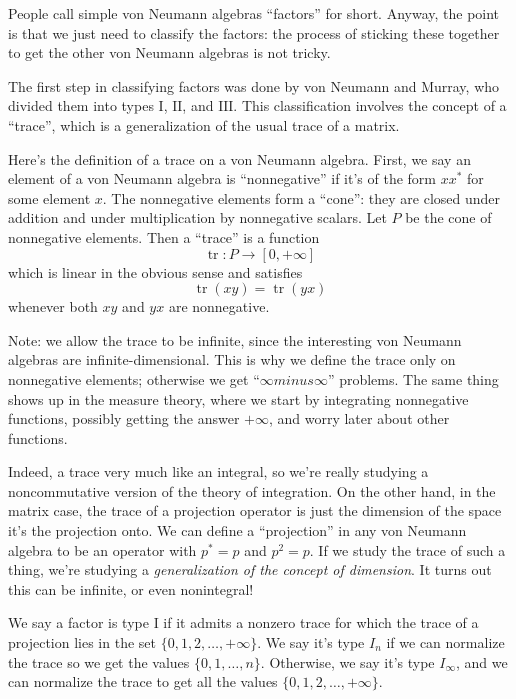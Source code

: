 \documentclass{article}
\begin{document}
People call simple von Neumann algebras ``factors'' for short. Anyway,
the point is that we just need to classify the factors: the process of
sticking these together to get the other von Neumann algebras is not
tricky.

The first step in classifying factors was done by von Neumann and
Murray, who divided them into types \(\mathrm{I}\), \(\mathrm{II}\), and
\(\mathrm{III}\). This classification involves the concept of a
``trace'', which is a generalization of the usual trace of a matrix.

Here's the definition of a trace on a von Neumann algebra. First, we say
an element of a von Neumann algebra is ``nonnegative'' if it's of the
form \(xx^*\) for some element \(x\). The nonnegative elements form a
``cone'': they are closed under addition and under multiplication by
nonnegative scalars. Let \(P\) be the cone of nonnegative elements. Then
a ``trace'' is a function \[\operatorname{tr}\colon P \to [0, +\infty]\]
which is linear in the obvious sense and satisfies
\[\operatorname{tr}(xy) = \operatorname{tr}(yx)\] whenever both \(xy\)
and \(yx\) are nonnegative.

Note: we allow the trace to be infinite, since the interesting von
Neumann algebras are infinite-dimensional. This is why we define the
trace only on nonnegative elements; otherwise we get
``\(\infty minus \infty\)'' problems. The same thing shows up in the
measure theory, where we start by integrating nonnegative functions,
possibly getting the answer \(+\infty\), and worry later about other
functions.

Indeed, a trace very much like an integral, so we're really studying a
noncommutative version of the theory of integration. On the other hand,
in the matrix case, the trace of a projection operator is just the
dimension of the space it's the projection onto. We can define a
``projection'' in any von Neumann algebra to be an operator with
\(p^* = p\) and \(p^2 = p\). If we study the trace of such a thing,
we're studying a \emph{generalization of the concept of dimension}. It
turns out this can be infinite, or even nonintegral!

We say a factor is type \(\mathrm{I}\) if it admits a nonzero trace for
which the trace of a projection lies in the set
\(\{0,1,2,\ldots,+\infty\}\). We say it's type \(I_n\) if we can
normalize the trace so we get the values \(\{0,1,\ldots,n\}\).
Otherwise, we say it's type \(I_\infty\), and we can normalize the trace
to get all the values \(\{0,1,2,\ldots,+\infty\}\).
\end{document}
